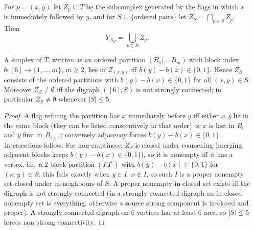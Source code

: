 For $p=(x,y)$ let $Z_p\subseteq T$ be the subcomplex generated by the flags in which $x$ is immediately followed by $y$, and for $S\subseteq\{\text{ordered pairs}\}$ let $Z_S=\bigcap_{p\in S}Z_p$. Then
\[
Y_{A_G}=\bigcup_{p\in B}Z_p .
\]
\begin{lemma}[description of $Z_S$]\label{lem:Z}
A simplex of $T$, written as an ordered partition $(B_1|\dots|B_m)$ with block index $b:[6]\to\{1,\dots,m\}$, $m\ge2$, lies in $Z_{(x,y)}$ iff $b(y)-b(x)\in\{0,1\}$. Hence $Z_S$ consists of the ordered partitions with $b(y)-b(x)\in\{0,1\}$ for all $(x,y)\in S$. Moreover $Z_S\neq\emptyset$ iff the digraph $([6],S)$ is not strongly connected; in particular $Z_S\ne\emptyset$ whenever $|S|\le5$.
\end{lemma}
\begin{proof}
A flag refining the partition has $x$ immediately before $y$ iff either $x,y$ lie in the same block (they can be listed consecutively in that order) or $x$ is last in $B_i$ and $y$ first in $B_{i+1}$; conversely adjacency forces $b(y)-b(x)\in\{0,1\}$. Intersections follow. For non-emptiness: $Z_S$ is closed under coarsening (merging adjacent blocks keeps $b(y)-b(x)\in\{0,1\}$), so it is nonempty iff it has a vertex, i.e.\ a $2$-block partition $(I|I^c)$ with $b(y)-b(x)\in\{0,1\}$ for $(x,y)\in S$; this fails exactly when $y\in I$, $x\notin I$, so such $I$ is a proper nonempty set closed under in-neighbours of $S$. A proper nonempty in-closed set exists iff the digraph is not strongly connected (in a strongly connected digraph an in-closed nonempty set is everything; otherwise a source strong component is in-closed and proper). A strongly connected digraph on $6$ vertices has at least $6$ arcs, so $|S|\le5$ forces non-strong-connectivity.
\end{proof}

